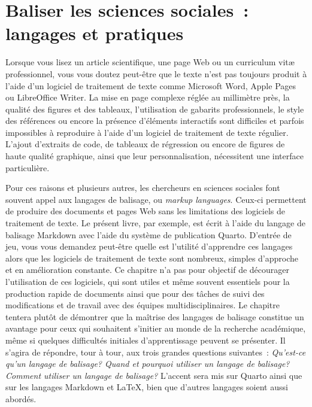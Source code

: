 \documentclass[
  letterpaper,
]{scrbook}
\begin{document}

\hypertarget{sec-chap7}{%
\chapter{Baliser les sciences sociales~: langages et
pratiques}\label{sec-chap7}}

Lorsque vous lisez un article scientifique, une page Web ou un
curriculum vitæ professionnel, vous vous doutez peut-être que le texte
n'est pas toujours produit à l'aide d'un logiciel de traitement de texte
comme Microsoft Word, Apple Pages ou LibreOffice Writer. La mise en page
complexe réglée au millimètre près, la qualité des figures et des
tableaux, l'utilisation de gabarits professionnels, le style des
références ou encore la présence d'éléments interactifs sont difficiles
et parfois impossibles à reproduire à l'aide d'un logiciel de traitement
de texte régulier. L'ajout d'extraits de code, de tableaux de régression
ou encore de figures de haute qualité graphique, ainsi que leur
personnalisation, nécessitent une interface particulière.

Pour ces raisons et plusieurs autres, les chercheurs en sciences
sociales font souvent appel aux langages de balisage, ou \emph{markup
languages}. Ceux-ci permettent de produire des documents et pages Web
sans les limitations des logiciels de traitement de texte. Le présent
livre, par exemple, est écrit à l'aide du langage de balisage Markdown
avec l'aide du système de publication Quarto. D'entrée de jeu, vous vous
demandez peut-être quelle est l'utilité d'apprendre ces langages alors
que les logiciels de traitement de texte sont nombreux, simples
d'approche et en amélioration constante. Ce chapitre n'a pas pour
objectif de décourager l'utilisation de ces logiciels, qui sont utiles
et même souvent essentiels pour la production rapide de documents ainsi
que pour des tâches de suivi des modifications et de travail avec des
équipes multidisciplinaires. Le chapitre tentera plutôt de démontrer que
la maîtrise des langages de balisage constitue un avantage pour ceux qui
souhaitent s'initier au monde de la recherche académique, même si
quelques difficultés initiales d'apprentissage peuvent se présenter. Il
s'agira de répondre, tour à tour, aux trois grandes questions
suivantes~: \emph{Qu'est-ce qu'un langage de balisage? Quand et pourquoi
utiliser un langage de balisage? Comment utiliser un langage de
balisage?} L'accent sera mis sur Quarto ainsi que sur les langages
Markdown et \LaTeX, bien que d'autres langages soient aussi abordés.
\end{document}

